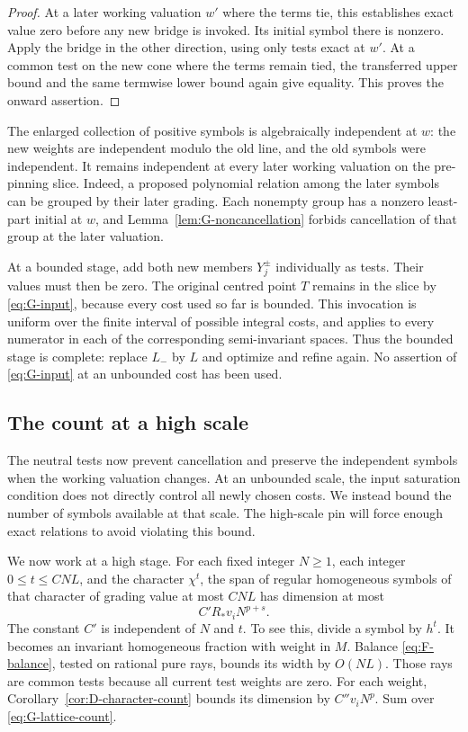 \begin{proof}
At a later working valuation $w'$ where the terms tie, this establishes
exact value zero before any new bridge is invoked.  Its initial symbol
there is nonzero.  Apply the bridge in the other direction, using only
tests exact at $w'$.  At a common test on the new cone where the terms
remain tied, the transferred upper bound and the same termwise lower
bound again give equality.  This proves the onward assertion.
\end{proof}

The enlarged collection of positive symbols is algebraically independent
at $w$: the new weights are independent modulo the old line, and the
old symbols were independent.  It remains independent at every later
working valuation on the pre-pinning slice.  Indeed, a proposed
polynomial relation among the later symbols can be grouped by their
later grading.  Each nonempty group has a nonzero least-part initial at
$w$, and Lemma~\ref{lem:G-noncancellation} forbids cancellation of that
group at the later valuation.

At a bounded stage, add both new members $Y_j^\pm$ individually as tests.
Their values must then be zero.  The original centred point $T$ remains
in the slice by \eqref{eq:G-input}, because every cost used so far is
bounded.  This invocation is uniform over the finite interval of
possible integral costs, and applies to every numerator in each of the
corresponding semi-invariant spaces.  Thus the bounded stage is complete:
replace $L_-$ by $L$ and optimize and refine again.  No assertion of
\eqref{eq:G-input} at an unbounded cost has been used.

\subsection{The count at a high scale}

The neutral tests now prevent cancellation and preserve the independent
symbols when the working valuation changes.  At an unbounded scale,
the input saturation condition does not directly control all newly
chosen costs.  We instead bound the number of symbols available at that
scale.  The high-scale pin will force enough exact relations to avoid
violating this bound.

We now work at a high stage.  For each fixed integer $N\ge1$, each integer
$0\le t\le CNL$, and the character $\chi^t$, the span of regular
homogeneous symbols of that character of grading value at most $CNL$
has dimension at most
\begin{equation}\label{eq:G-count}
                            C'R_*v_iN^{p+s}.
\end{equation}
The constant $C'$ is independent of $N$ and $t$.  To see this, divide a
symbol by $h^t$.  It becomes an invariant homogeneous fraction with
weight in $M$.  Balance \eqref{eq:F-balance}, tested on rational pure
rays, bounds its width by $O(NL)$.  Those rays are common tests because
all current test weights are zero.  For each weight,
Corollary~\ref{cor:D-character-count} bounds its dimension by
$C''v_iN^p$.  Sum over \eqref{eq:G-lattice-count}.

